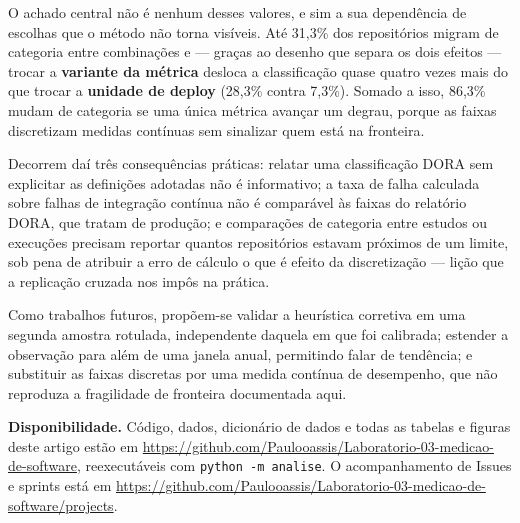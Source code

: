 \documentclass[12pt]{article}
\begin{document}
O achado central não é nenhum desses valores, e sim a sua dependência de escolhas que o
método não torna visíveis. Até 31,3\% dos repositórios migram de categoria entre combinações
e --- graças ao desenho que separa os dois efeitos --- trocar a \textbf{variante da métrica}
desloca a classificação quase quatro vezes mais do que trocar a \textbf{unidade de deploy}
(28,3\% contra 7,3\%). Somado a isso, 86,3\% mudam de categoria se uma única métrica avançar um
degrau, porque as faixas discretizam medidas contínuas sem sinalizar quem está na fronteira.

Decorrem daí três consequências práticas: relatar uma classificação DORA sem explicitar as
definições adotadas não é informativo; a taxa de falha calculada sobre falhas de integração contínua não é comparável às
faixas do relatório DORA, que tratam de produção; e comparações de categoria entre estudos ou
execuções precisam reportar quantos repositórios estavam próximos de um limite, sob pena de
atribuir a erro de cálculo o que é efeito da discretização --- lição que a replicação cruzada
nos impôs na prática.

Como trabalhos futuros, propõem-se validar a heurística corretiva em uma segunda amostra
rotulada, independente daquela em que foi calibrada; estender a observação para além de uma
janela anual, permitindo falar de tendência; e substituir as faixas discretas por uma medida
contínua de desempenho, que não reproduza a fragilidade de fronteira documentada aqui.

\vspace{0.2cm}
\noindent\textbf{Disponibilidade.} Código, dados, dicionário de dados e todas as tabelas e
figuras deste artigo estão em
\url{https://github.com/Paulooassis/Laboratorio-03-medicao-de-software}, reexecutáveis com
\texttt{python -m analise}. O acompanhamento de Issues e sprints está em
\url{https://github.com/Paulooassis/Laboratorio-03-medicao-de-software/projects}.

\end{document}
